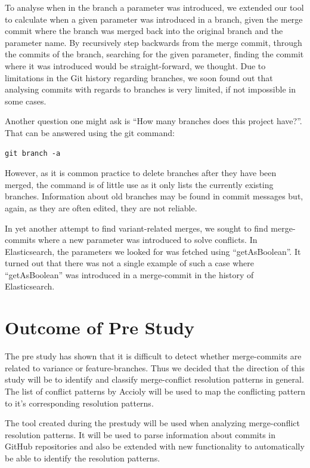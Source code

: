 To analyse when in the branch a parameter was introduced, we extended our tool to calculate when a given parameter was introduced in a branch, given the merge commit where the branch was merged back into the original branch and the parameter name. By recursively step backwards from the merge commit, through the commits of the branch, searching for the given parameter, finding the commit where it was introduced would be straight-forward, we thought. Due to limitations in the Git history regarding branches, we soon found out that analysing commits with regards to branches is very limited, if not impossible in some cases.

Another question one might ask is “How many branches does this project have?”. That can be answered using the git command:
\lstset{language=Bash}
\begin{lstlisting}[frame=single]
git branch -a
\end{lstlisting}
However, as it is common practice to delete branches after they have been merged, the command is of little use as it only lists the currently existing branches. Information about old branches may be found in commit messages but, again, as they are often edited, they are not reliable.

In yet another attempt to find variant-related merges, we sought to find merge-commits where a new parameter was introduced to solve conflicts. In Elasticsearch, the parameters we looked for was fetched using “getAsBoolean”. It turned out that there was not a single example of such a case where “getAsBoolean” was introduced in a merge-commit in the history of Elasticsearch.
\section{Outcome of Pre Study}
The pre study has shown that it is difficult to detect whether merge-commits are related to variance or feature-branches. Thus we decided that the direction of this study will be to identify and classify merge-conflict resolution patterns in general. The list of conflict patterns by Accioly will be used to map the conflicting pattern to it’s corresponding resolution patterns.

The tool created during the prestudy will be used when analyzing merge-conflict resolution patterns. It will be used to parse information about commits in GitHub repositories and also be extended with new functionality to automatically be able to identify the resolution patterns.




